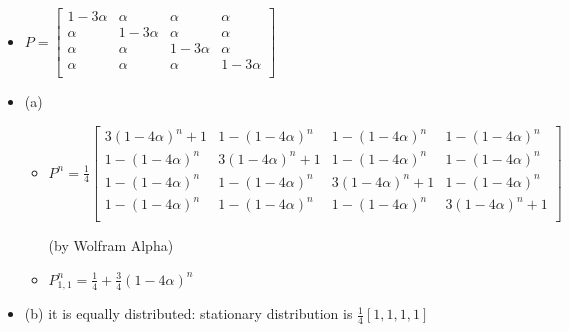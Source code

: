 \documentclass[a4paper]{article}
\begin{document}
\section{}
\begin{itemize}
        \begin{figure} [H]
            \texttt{[image: image/3.png]}
        \end{figure}
    \item $P = \left[ \begin{array}{cccc}
                1-3 \alpha & \alpha & \alpha & \alpha \\
                \alpha & 1-3 \alpha & \alpha & \alpha \\
                \alpha & \alpha & 1-3 \alpha & \alpha \\
                \alpha & \alpha & \alpha & 1-3 \alpha \\
            \end{array} \right]$
    \item (a)
        \begin{itemize}
            \item $P^n = \frac{1}{4}\left[ \begin{array}{cccc}
                        3(1-4\alpha)^n + 1 & 1 - (1-4\alpha)^n & 1 - (1-4\alpha)^n & 1 - (1-4\alpha)^n \\
                        1 - (1-4\alpha)^n & 3(1-4\alpha)^n + 1 & 1 - (1-4\alpha)^n & 1 - (1-4\alpha)^n \\
                        1 - (1-4\alpha)^n & 1 - (1-4\alpha)^n & 3(1-4\alpha)^n + 1 & 1 - (1-4\alpha)^n \\
                        1 - (1-4\alpha)^n & 1 - (1-4\alpha)^n & 1 - (1-4\alpha)^n & 3(1-4\alpha)^n + 1 \\
                \end{array} \right]$

                (by Wolfram Alpha)
            \item $P_{1, 1}^n = \frac{1}{4} + \frac{3}{4}(1-4\alpha)^n$
        \end{itemize}
    \item (b) it is equally distributed: stationary distribution is $\frac{1}{4}[1, 1, 1, 1]$
\end{itemize}
\end{document}
